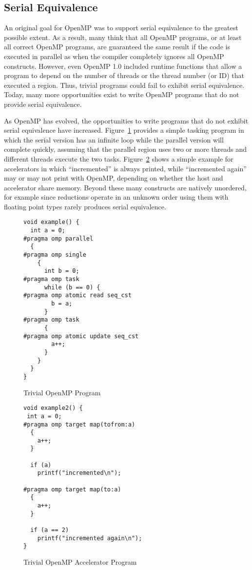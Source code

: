 \subsection{Serial Equivalence}
\label{sub:serial_equivalence}

An original goal for OpenMP was to support serial equivalence to the 
greatest possible extent. As a result, many think that all OpenMP programs, 
or at least all correct OpenMP programs, are guaranteed the same result
if the code is executed in parallel as when the compiler completely 
ignores all OpenMP constructs. However, even OpenMP 1.0 included runtime
functions that allow a program to depend on the number of threads or the
thread number (or ID) that executed a region. Thus, trivial programs could
fail to exhibit serial equivalence. Today, many more opportunities exist
to write OpenMP programs that do not provide serial equivalence. 

As OpenMP has evolved, the opportunities to write programs that do not exhibit
serial equivalence have increased. Figure~\ref{fig:trivial_task} provides a
simple tasking program in which the serial version has an infinite loop while
the parallel version will complete quickly, assuming that the parallel region
uses two or more threads and different threads execute the two tasks.
Figure~\ref{fig:trivial_target} shows a simple example for accelerators in
which ``incremented'' is always printed, while ``incremented again'' may or may
not print with OpenMP, depending on whether the host and accelerator share
memory. Beyond these many constructs are natively unordered, for example since
reductions operate in an unknown order using them with floating point types
rarely produces serial equivalence.

\begin{figure}
\begin{verbatim}
void example() {
  int a = 0;
#pragma omp parallel
  {
#pragma omp single
    {
      int b = 0;
#pragma omp task
      while (b == 0) {
#pragma omp atomic read seq_cst
        b = a;
      }
#pragma omp task
      {
#pragma omp atomic update seq_cst
        a++;
      }
    }
  }
}
\end{verbatim}
\caption{Trivial OpenMP Program\label{fig:trivial_task}}
\end{figure}

\begin{figure}
\begin{verbatim}
void example2() {
 int a = 0;
#pragma omp target map(tofrom:a)
  {
    a++;
  }

  if (a)
    printf("incremented\n");
  
#pragma omp target map(to:a)
  {
    a++;
  }

  if (a == 2)
    printf("incremented again\n");
}
\end{verbatim}
\caption{Trivial OpenMP Accelerator Program\label{fig:trivial_target}}
\end{figure}


